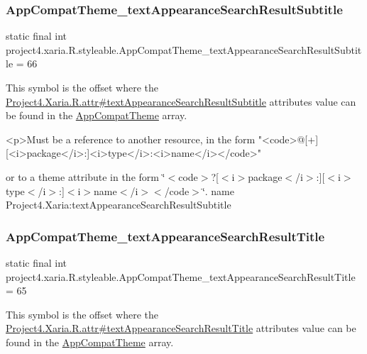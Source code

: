 \subsubsection{\texorpdfstring{App\+Compat\+Theme\+\_\+text\+Appearance\+Search\+Result\+Subtitle}{AppCompatTheme\_textAppearanceSearchResultSubtitle}}
{\footnotesize\ttfamily static final int project4.\+xaria.\+R.\+styleable.\+App\+Compat\+Theme\+\_\+text\+Appearance\+Search\+Result\+Subtitle = 66\hspace{0.3cm}{\ttfamily [static]}}

This symbol is the offset where the \hyperlink{}{Project4.\+Xaria.\+R.\+attr\#text\+Appearance\+Search\+Result\+Subtitle} attribute\textquotesingle{}s value can be found in the \hyperlink{classproject4_1_1xaria_1_1R_1_1styleable_aad8bec413e2350f9404e6ff0e831a85d}{App\+Compat\+Theme} array.

\begin{DoxyVerb}      <p>Must be a reference to another resource, in the form "<code>@[+][<i>package</i>:]<i>type</i>:<i>name</i></code>"
\end{DoxyVerb}
 or to a theme attribute in the form \char`\"{}$<$code$>$?\mbox{[}$<$i$>$package$<$/i$>$\+:\mbox{]}\mbox{[}$<$i$>$type$<$/i$>$\+:\mbox{]}$<$i$>$name$<$/i$>$$<$/code$>$\char`\"{}.  name Project4.\+Xaria\+:text\+Appearance\+Search\+Result\+Subtitle \mbox{\label{classproject4_1_1xaria_1_1R_1_1styleable_a489601ae9406c0857de192f2c579d01f}} 
\subsubsection{\texorpdfstring{App\+Compat\+Theme\+\_\+text\+Appearance\+Search\+Result\+Title}{AppCompatTheme\_textAppearanceSearchResultTitle}}
{\footnotesize\ttfamily static final int project4.\+xaria.\+R.\+styleable.\+App\+Compat\+Theme\+\_\+text\+Appearance\+Search\+Result\+Title = 65\hspace{0.3cm}{\ttfamily [static]}}

This symbol is the offset where the \hyperlink{}{Project4.\+Xaria.\+R.\+attr\#text\+Appearance\+Search\+Result\+Title} attribute\textquotesingle{}s value can be found in the \hyperlink{classproject4_1_1xaria_1_1R_1_1styleable_aad8bec413e2350f9404e6ff0e831a85d}{App\+Compat\+Theme} array.

